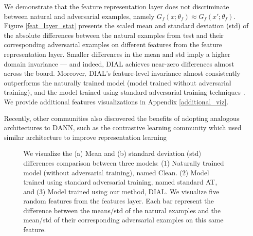 We demonstrate that the feature representation layer does not discriminate between natural and adversarial examples, namely $G_f(x;\theta_f)\approx G_f(x';\theta_f)$. Figure  \ref{feat_layer_stat} presents the scaled mean and standard deviation (std)
of the
absolute differences between the natural examples from test and their 
corresponding 
adversarial 
examples on different features from the feature representation layer.
Smaller differences in the mean and std
imply a higher domain invariance
--- and indeed, DIAL achieves
near-zero differences almost across the board.
Moreover, DIAL's feature-level invariance almost consistently 
outperforms
the naturally trained model (model trained without adversarial training), and the model trained using standard adversarial training
techniques~\citep{madry2017towards}. We provide additional features visualizations in Appendix \ref{additional_viz}. 

Recently, other communities also discovered the benefits of adopting analogous architectures to DANN, such as the contrastive learning community which used similar architecture to improve representation learning \citep{dangovski2021equivariant, wang2021residual}

\begin{figure}[ht]
\centering
    \caption{We visualize the (a) Mean and (b) standard deviation (std) differences comparison between three models: (1) Naturally trained model (without adversarial training), named Clean. (2) Model trained using standard adversarial training, named standard AT, and (3) Model trained using our method, DIAL.
    We visualize five random features from the features layer. Each bar represent the difference between the means/std of the natural examples and the mean/std of their corresponding adversarial examples on this same feature.}
  \label{feat_layer_stat}
  \label{pgd_cifar10}
\end{figure}


